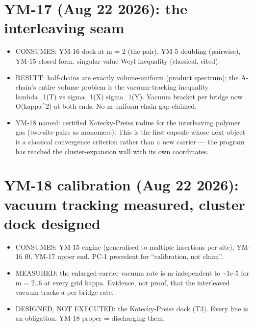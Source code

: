 \hypertarget{ym-17-aug-22-2026-the-interleaving-seam}{%
\section{YM-17 (Aug 22 2026): the interleaving seam}\label{ym-17-aug-22-2026-the-interleaving-seam}}

\begin{itemize}
\tightlist
\item
  CONSUMES: YM-16 dock at m = 2 (the pair), YM-5 doubling (pairwise),
  YM-15 closed form, singular-value Weyl inequality (classical, cited).
\item
  RESULT: half-chains are exactly volume-uniform (product spectrum); the
  A-chain's entire volume problem is the vacuum-tracking inequality
  lambda\_1(T) vs sigma\_1(X) sigma\_1(Y). Vacuum bracket per bridge now
  O(kappa\^{}2) at both ends. No m-uniform chain gap claimed.
\item
  YM-18 named: certified Kotecky-Preiss radius for the interleaving
  polymer gas (two-site pairs as monomers). This is the first capsule
  whose next object is a classical convergence criterion rather than a
  new carrier --- the program has reached the cluster-expansion wall with
  its own coordinates.
\end{itemize}

\hypertarget{ym-18-calibration-aug-22-2026-vacuum-tracking-measured-cluster-dock-designed}{%
\section{YM-18 calibration (Aug 22 2026): vacuum tracking measured, cluster dock designed}\label{ym-18-calibration-aug-22-2026-vacuum-tracking-measured-cluster-dock-designed}}

\begin{itemize}
\tightlist
\item
  CONSUMES: YM-15 engine (generalised to multiple insertions per site),
  YM-16 f0, YM-17 upper end. PC-1 precedent for ``calibration, not claim''.
\item
  MEASURED: the enlarged-carrier vacuum rate is m-independent to \textasciitilde1e-5
  for m = 2..6 at every grid kappa. Evidence, not proof, that the
  interleaved vacuum tracks a per-bridge rate.
\item
  DESIGNED, NOT EXECUTED: the Kotecky-Preiss dock (T3). Every line is an
  obligation. YM-18 proper = discharging them.
\end{itemize}

